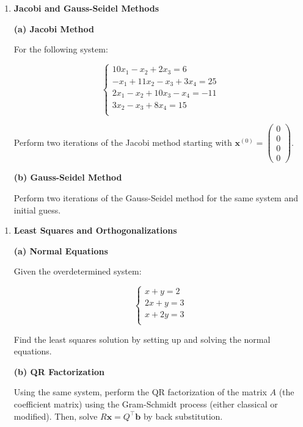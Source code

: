 \documentclass[
]{article}
\begin{document}
\newpage

\begin{enumerate}
\def\labelenumi{\arabic{enumi}.}
\setcounter{enumi}{2}
\item
  \textbf{Jacobi and Gauss-Seidel Methods}

  \textbf{(a) Jacobi Method}

  For the following system:

  \[
  \begin{cases}
  10x_1 - x_2 + 2x_3 = 6 \\
  -x_1 + 11x_2 - x_3 + 3x_4 = 25 \\
  2x_1 - x_2 + 10x_3 - x_4 = -11 \\
  3x_2 - x_3 + 8x_4 = 15 \\
  \end{cases}
  \]

  Perform two iterations of the Jacobi method starting with
  \(\mathbf{x}^{(0)} = \begin{pmatrix} 0 \\ 0 \\ 0 \\ 0 \end{pmatrix}\).

  \vspace{7cm}

  \textbf{(b) Gauss-Seidel Method}

  Perform two iterations of the Gauss-Seidel method for the same system
  and initial guess.
\end{enumerate}

\newpage

\begin{enumerate}
\def\labelenumi{\arabic{enumi}.}
\setcounter{enumi}{3}
\item
  \textbf{Least Squares and Orthogonalizations}

  \textbf{(a) Normal Equations}

  Given the overdetermined system:

  \[
  \begin{cases}
  x + y = 2 \\
  2x + y = 3 \\
  x + 2y = 3 \\
  \end{cases}
  \]

  Find the least squares solution by setting up and solving the normal
  equations.

  \vspace{7cm}

  \textbf{(b) QR Factorization}

  Using the same system, perform the QR factorization of the matrix
  \(A\) (the coefficient matrix) using the Gram-Schmidt process (either
  classical or modified). Then, solve \(R\mathbf{x} = Q^\top\mathbf{b}\)
  by back substitution.
\end{enumerate}
\end{document}
